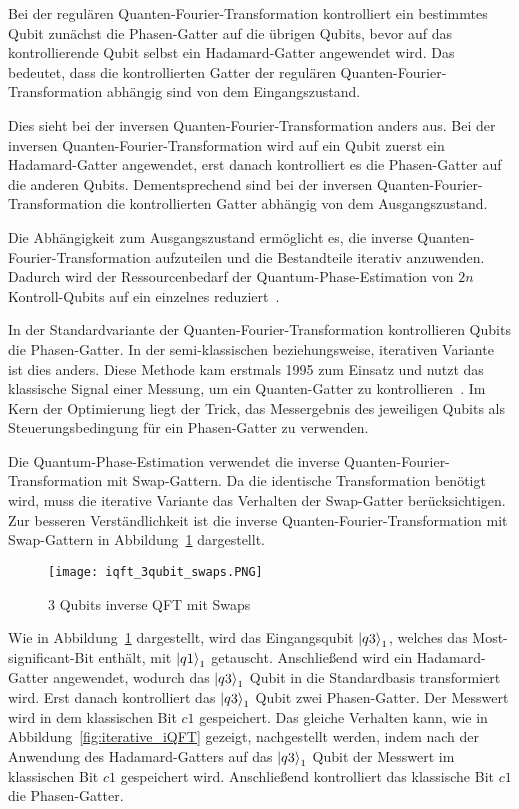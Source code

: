 Bei der regulären Quanten-Fourier-Transformation kontrolliert ein bestimmtes Qubit zunächst die Phasen-Gatter auf die übrigen Qubits, 
bevor auf das kontrollierende Qubit selbst ein Hadamard-Gatter angewendet wird.
Das bedeutet, dass die kontrollierten Gatter der regulären Quanten-Fourier-Transformation abhängig sind von dem Eingangszustand.

Dies sieht bei der inversen Quanten-Fourier-Transformation anders aus.
Bei der inversen Quanten-Fourier-Transformation wird auf ein Qubit zuerst ein Hadamard-Gatter angewendet, 
erst danach kontrolliert es die Phasen-Gatter auf die anderen Qubits.
Dementsprechend sind bei der inversen Quanten-Fourier-Transformation die kontrollierten Gatter abhängig von dem Ausgangszustand.

Die Abhängigkeit zum Ausgangszustand ermöglicht es, 
die inverse Quanten-Fourier-Transformation aufzuteilen und die Bestandteile iterativ anzuwenden.
Dadurch wird der Ressourcenbedarf der Quantum-Phase-Estimation von \(2n\) Kontroll-Qubits auf ein einzelnes reduziert~\cite{Parker2000}.

In der Standardvariante der Quanten-Fourier-Transformation kontrollieren Qubits die Phasen-Gatter.
In der semi-klassischen beziehungsweise, iterativen Variante ist dies anders.
Diese Methode kam erstmals 1995 zum Einsatz und 
nutzt das klassische Signal einer Messung, 
um ein Quanten-Gatter zu kontrollieren~\cite{Griffiths_1996}.
Im Kern der Optimierung liegt der Trick, 
das Messergebnis des jeweiligen Qubits als Steuerungsbedingung für ein Phasen-Gatter zu verwenden.

Die Quantum-Phase-Estimation verwendet die inverse Quanten-Fourier-Transformation mit Swap-Gattern.
Da die identische Transformation benötigt wird, 
muss die iterative Variante das Verhalten der Swap-Gatter berücksichtigen.
Zur besseren Verständlichkeit ist die inverse Quanten-Fourier-Transformation mit Swap-Gattern in Abbildung~\ref{fig:iQFTswaps} dargestellt.
\begin{figure}[H]
  \centering
  \texttt{[image: iqft\_3qubit\_swaps.PNG]}
  \caption{3 Qubits inverse QFT mit Swaps}
  \label{fig:iQFTswaps}
\end{figure}
Wie in Abbildung~\ref{fig:iQFTswaps} dargestellt, 
wird das Eingangsqubit \(\ket{q3}_1\), welches das Most-significant-Bit enthält, 
mit \(\ket{q1}_1\) getauscht. 
Anschließend wird ein Hadamard-Gatter angewendet, 
wodurch das \(\ket{q3}_1\) Qubit in die Standardbasis transformiert wird. 
Erst danach kontrolliert das \(\ket{q3}_1\) Qubit zwei Phasen-Gatter.
Der Messwert wird in dem klassischen Bit \(c1\) gespeichert.
Das gleiche Verhalten kann, wie in Abbildung~\ref{fig:iterative_iQFT} gezeigt, nachgestellt werden, 
indem nach der Anwendung des Hadamard-Gatters auf das \(\ket{q3}_1\) Qubit 
der Messwert im klassischen Bit \(c1\) gespeichert wird.
Anschließend kontrolliert das klassische Bit \(c1\) die Phasen-Gatter.

